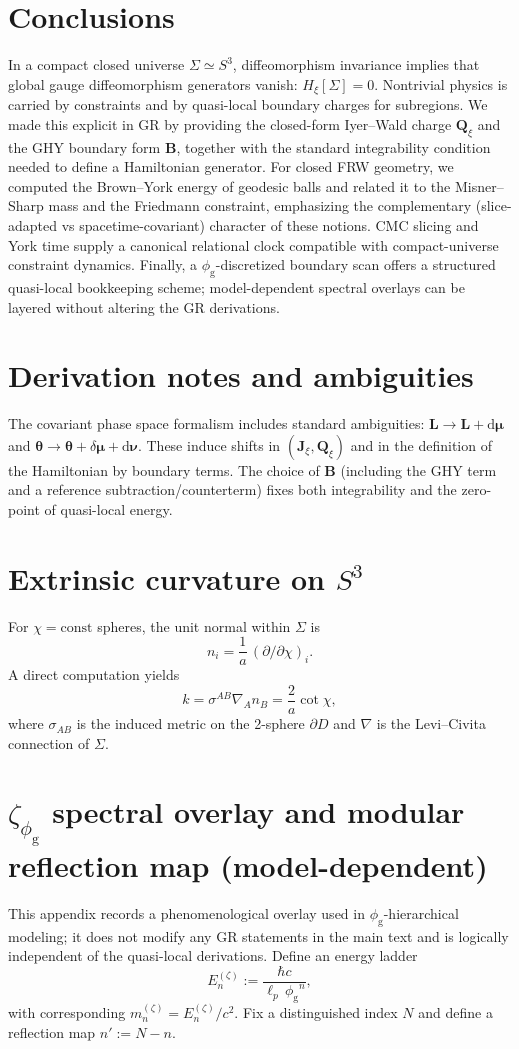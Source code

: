\documentclass[
  reprint,
  amsmath,amssymb,
  aps,
  prd,
  superscriptaddress,
  nofootinbib,
  longbibliography
]{revtex4-2}
\newcommand{\dd}{\mathrm{d}}
\newcommand{\goldconst}{\ensuremath{\phi_{\!\mathrm{g}}}} %
\newcommand{\Lform}{\bm{L}}
\newcommand{\tht}{\bm{\theta}}
\newcommand{\J}{\bm{J}}
\newcommand{\Q}{\bm{Q}}
\newcommand{\Bnd}{\bm{B}}
\begin{document}
\section{Conclusions}
In a compact closed universe $\Sigma\simeq S^3$, diffeomorphism invariance implies that global gauge diffeomorphism generators vanish: $H_\xi[\Sigma]=0$.
Nontrivial physics is carried by constraints and by quasi-local boundary charges for subregions.
We made this explicit in GR by providing the closed-form Iyer--Wald charge $\Q_\xi$ and the GHY boundary form $\Bnd$, together with the standard integrability condition needed to define a Hamiltonian generator.
For closed FRW geometry, we computed the Brown--York energy of geodesic balls and related it to the Misner--Sharp mass and the Friedmann constraint, emphasizing the complementary (slice-adapted vs spacetime-covariant) character of these notions.
CMC slicing and York time supply a canonical relational clock compatible with compact-universe constraint dynamics.
Finally, a $\goldconst$-discretized boundary scan offers a structured quasi-local bookkeeping scheme; model-dependent spectral overlays can be layered without altering the GR derivations.
\appendix
\section{Derivation notes and ambiguities}
The covariant phase space formalism includes standard ambiguities:
$\Lform\to\Lform+\dd\bm{\mu}$ and $\tht\to\tht+\delta\bm{\mu}+\dd\bm{\nu}$.
These induce shifts in $(\J_\xi,\Q_\xi)$ and in the definition of the Hamiltonian by boundary terms.
The choice of $\Bnd$ (including the GHY term and a reference subtraction/counterterm) fixes both integrability and the zero-point of quasi-local energy.
\section{Extrinsic curvature on \texorpdfstring{$S^3$}{S3}}
For $\chi=\mathrm{const}$ spheres, the unit normal within $\Sigma$ is
\begin{equation}
n_i=\frac{1}{a}\,(\partial/\partial\chi)_i.
\end{equation}
A direct computation yields
\begin{equation}
k=\sigma^{AB}\nabla_A n_B=\frac{2}{a}\cot\chi,
\end{equation}
where $\sigma_{AB}$ is the induced metric on the 2-sphere $\partial D$ and $\nabla$ is the Levi--Civita connection of $\Sigma$.
\section{\texorpdfstring{$\zeta_{\goldconst}$}{zeta_phi_g} spectral overlay and modular reflection map (model-dependent)}
This appendix records a phenomenological overlay used in $\goldconst$-hierarchical modeling; it does not modify any GR statements in the main text and is logically independent of the quasi-local derivations.
Define an energy ladder
\begin{equation}
E^{(\zeta)}_n := \frac{\hbar c}{\ell_p\,\goldconst^n},
\end{equation}
with corresponding $m^{(\zeta)}_n=E^{(\zeta)}_n/c^2$.
Fix a distinguished index $N$ and define a reflection map $n':=N-n$.
\end{document}
